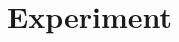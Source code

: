 \documentclass[doc, floatsintext]{apa6}
\begin{document}



%


\section{Experiment}

\end{document}
